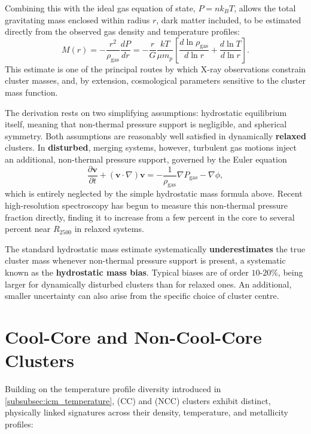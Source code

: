 \medskip

Combining this with the ideal gas equation of state, $P = n k_B T$, allows the total gravitating mass enclosed within radius $r$, dark matter included, to be estimated directly from the observed gas density and temperature profiles:
$$
M(r) = -\frac{r^2}{\rho_{\text{gas}}}\frac{dP}{dr} = -\frac{r}{G}\frac{kT}{\mu m_p}\left[\frac{d\ln\rho_{\text{gas}}}{d\ln r} + \frac{d\ln T}{d\ln r}\right] .
$$
This  estimate is one of the principal routes by which X-ray observations constrain cluster masses, and, by extension, cosmological parameters sensitive to the cluster mass function.

\medskip

The derivation rests on two simplifying assumptions: hydrostatic equilibrium itself, meaning that non-thermal pressure support is negligible, and spherical symmetry. Both assumptions are reasonably well satisfied in dynamically \textbf{relaxed} clusters. In \textbf{disturbed}, merging systems, however, turbulent gas motions inject an additional, non-thermal pressure support, governed by the Euler equation
$$
\frac{\partial \mathbf{v}}{\partial t} + (\mathbf{v}\cdot\nabla)\mathbf{v} = -\frac{1}{\rho_{\text{gas}}}\nabla P_{\text{gas}} - \nabla\phi ,
$$
which is entirely neglected by the simple hydrostatic mass formula above. Recent high-resolution spectroscopy has begun to measure this non-thermal pressure fraction directly, finding it to increase from a few percent in the core to several percent near $R_{2500}$ in relaxed systems.

\begin{observationblock}
The standard hydrostatic mass estimate systematically \textbf{underestimates} the true cluster mass whenever non-thermal pressure support is present, a systematic known as the \textbf{hydrostatic mass bias}. Typical biases are of order $10$-$20\%$, being larger for dynamically disturbed clusters than for relaxed ones. An additional, smaller uncertainty can also arise from the specific choice of cluster centre.
\end{observationblock}

\section{Cool-Core and Non-Cool-Core Clusters} \label{sec:cool_core}

Building on the temperature profile diversity introduced in \cref{subsubsec:icm_temperature},  (CC) and  (NCC) clusters exhibit distinct, physically linked signatures across their density, temperature, and metallicity profiles:

